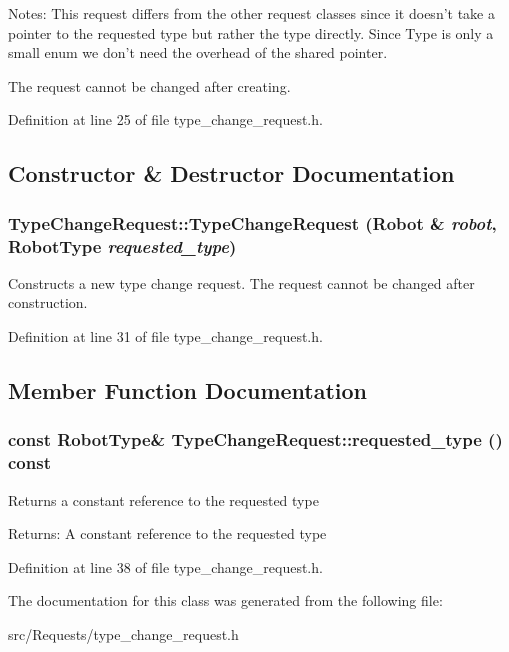 Notes: This request differs from the other request classes since it doesn't take a pointer to the requested type but rather the type directly. Since Type is only a small enum we don't need the overhead of the shared pointer.

The request cannot be changed after creating. 

Definition at line 25 of file type\_\-change\_\-request.h.

\subsection{Constructor \& Destructor Documentation}
\hypertarget{class_type_change_request_2722d08bb752b22163f2cb0fd82e1d6d}{
\subsubsection[TypeChangeRequest]{\setlength{\rightskip}{0pt plus 5cm}TypeChangeRequest::TypeChangeRequest (Robot \& {\em robot}, \/  RobotType {\em requested\_\-type})}}
\label{class_type_change_request_2722d08bb752b22163f2cb0fd82e1d6d}


Constructs a new type change request. The request cannot be changed after construction. 

Definition at line 31 of file type\_\-change\_\-request.h.

\subsection{Member Function Documentation}
\hypertarget{class_type_change_request_bba308af9b35aa89b2feb9665249ea9a}{
\subsubsection[requested\_\-type]{\setlength{\rightskip}{0pt plus 5cm}const RobotType\& TypeChangeRequest::requested\_\-type () const}}
\label{class_type_change_request_bba308af9b35aa89b2feb9665249ea9a}


Returns a constant reference to the requested type \begin{Desc}
\item[Returns:]A constant reference to the requested type \end{Desc}


Definition at line 38 of file type\_\-change\_\-request.h.

The documentation for this class was generated from the following file:\begin{CompactItemize}
\item 
src/Requests/type\_\-change\_\-request.h\end{CompactItemize}
